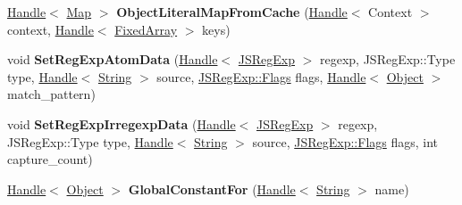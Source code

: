 \begin{DoxyCompactItemize}
\item 
\hypertarget{classv8_1_1internal_1_1_v8___f_i_n_a_l_a32d92a6844690b55e3d96d9c5d2d15d7}{}\hyperlink{classv8_1_1internal_1_1_handle}{Handle}$<$ \hyperlink{classv8_1_1internal_1_1_map}{Map} $>$ {\bfseries Object\+Literal\+Map\+From\+Cache} (\hyperlink{classv8_1_1internal_1_1_handle}{Handle}$<$ Context $>$ context, \hyperlink{classv8_1_1internal_1_1_handle}{Handle}$<$ \hyperlink{classv8_1_1internal_1_1_fixed_array}{Fixed\+Array} $>$ keys)\label{classv8_1_1internal_1_1_v8___f_i_n_a_l_a32d92a6844690b55e3d96d9c5d2d15d7}

\item 
\hypertarget{classv8_1_1internal_1_1_v8___f_i_n_a_l_a4ae55289b9099d6bc78535b763d2d52d}{}void {\bfseries Set\+Reg\+Exp\+Atom\+Data} (\hyperlink{classv8_1_1internal_1_1_handle}{Handle}$<$ \hyperlink{classv8_1_1internal_1_1_j_s_reg_exp}{J\+S\+Reg\+Exp} $>$ regexp, J\+S\+Reg\+Exp\+::\+Type type, \hyperlink{classv8_1_1internal_1_1_handle}{Handle}$<$ \hyperlink{classv8_1_1internal_1_1_string}{String} $>$ source, \hyperlink{classv8_1_1internal_1_1_j_s_reg_exp_1_1_flags}{J\+S\+Reg\+Exp\+::\+Flags} flags, \hyperlink{classv8_1_1internal_1_1_handle}{Handle}$<$ \hyperlink{classv8_1_1internal_1_1_object}{Object} $>$ match\+\_\+pattern)\label{classv8_1_1internal_1_1_v8___f_i_n_a_l_a4ae55289b9099d6bc78535b763d2d52d}

\item 
\hypertarget{classv8_1_1internal_1_1_v8___f_i_n_a_l_aa63855e0f5d6702cb2302ad0843df78a}{}void {\bfseries Set\+Reg\+Exp\+Irregexp\+Data} (\hyperlink{classv8_1_1internal_1_1_handle}{Handle}$<$ \hyperlink{classv8_1_1internal_1_1_j_s_reg_exp}{J\+S\+Reg\+Exp} $>$ regexp, J\+S\+Reg\+Exp\+::\+Type type, \hyperlink{classv8_1_1internal_1_1_handle}{Handle}$<$ \hyperlink{classv8_1_1internal_1_1_string}{String} $>$ source, \hyperlink{classv8_1_1internal_1_1_j_s_reg_exp_1_1_flags}{J\+S\+Reg\+Exp\+::\+Flags} flags, int capture\+\_\+count)\label{classv8_1_1internal_1_1_v8___f_i_n_a_l_aa63855e0f5d6702cb2302ad0843df78a}

\item 
\hypertarget{classv8_1_1internal_1_1_v8___f_i_n_a_l_a080f6631878b62f743152bd1550a2dc2}{}\hyperlink{classv8_1_1internal_1_1_handle}{Handle}$<$ \hyperlink{classv8_1_1internal_1_1_object}{Object} $>$ {\bfseries Global\+Constant\+For} (\hyperlink{classv8_1_1internal_1_1_handle}{Handle}$<$ \hyperlink{classv8_1_1internal_1_1_string}{String} $>$ name)\label{classv8_1_1internal_1_1_v8___f_i_n_a_l_a080f6631878b62f743152bd1550a2dc2}


\end{DoxyCompactItemize}
